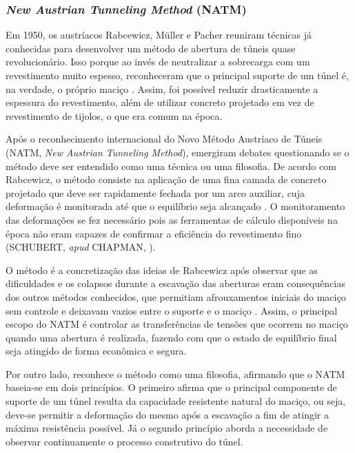\subsubsection{\textit{New Austrian Tunneling Method} (NATM)}

Em 1950, os austríacos Rabcewicz, Müller e Pacher reuniram técnicas já conhecidas para desenvolver um método de abertura de túneis quase revolucionário. Isso porque ao invés de neutralizar a sobrecarga com um revestimento muito espesso, reconheceram que o principal suporte de um túnel é, na verdade, o próprio maciço \cite{Chapman2018}. Assim, foi possível reduzir drasticamente a espessura do revestimento, além de utilizar concreto projetado em vez de revestimento de tijolos, o que era comum na época.

Após o reconhecimento internacional do Novo Método Austríaco de Túneis (NATM, \textit{New Austrian Tunneling Method}), emergiram debates questionando se o método deve ser entendido como uma técnica ou uma filosofia. De acordo com Rabcewicz, o método consiste na aplicação de uma fina camada de concreto projetado que deve ser rapidamente fechada por um arco auxiliar, cuja deformação é monitorada até que o equilíbrio seja alcançado \cite{Karakus2004}. O monitoramento das deformações se fez necessário pois as ferramentas de cálculo disponíveis na época não eram capazes de confirmar a eficiência do revestimento fino (SCHUBERT, \citeyear{Schubert1999} \textit{apud} CHAPMAN, \citeyear{Chapman2018}).

O método é a concretização das ideias de Rabcewicz após observar que as dificuldades e os colapsos durante a escavação das aberturas eram consequências dos outros métodos conhecidos, que permitiam afrouxamentos iniciais do maciço sem controle e deixavam vazios entre o suporte e o maciço \cite{Gomes2006}. Assim, o principal escopo do NATM é controlar as transferências de tensões que ocorrem no maciço quando uma abertura é realizada, fazendo com que o estado de equilíbrio final seja atingido de forma econômica e segura.

Por outro lado,  reconhece o método como uma filosofia, afirmando que o NATM baseia-se em dois princípios. O primeiro afirma que o principal componente de suporte de um túnel resulta da capacidade resistente natural do maciço, ou seja, deve-se permitir a deformação do mesmo após a escavação a fim de atingir a máxima resistência possível. Já o segundo princípio aborda a necessidade de observar continuamente o processo construtivo do túnel.

